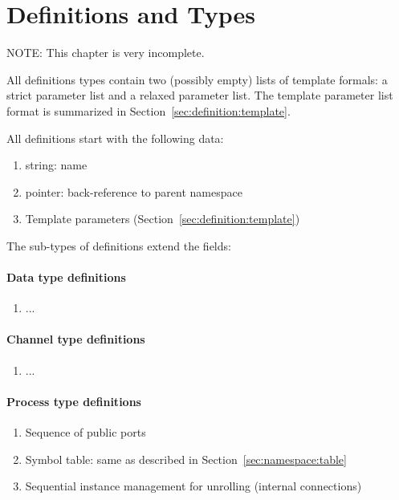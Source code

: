 
\chapter{Definitions and Types}
\label{sec:definition}

NOTE: This chapter is very incomplete.  

All definitions types contain two (possibly empty) lists of template
formals: a strict parameter list and a relaxed parameter list.  
The template parameter list format is summarized
in Section~\ref{sec:definition:template}.  

All definitions start with the following data:
\begin{enumerate}
\item string: name
\item pointer: back-reference to parent namespace
\item Template parameters (Section~\ref{sec:definition:template})
\end{enumerate}

The sub-types of definitions extend the fields:

\subsubsection{Data type definitions}
\begin{enumerate}
\item ...
\end{enumerate}

\subsubsection{Channel type definitions}
\begin{enumerate}
\item ...
\end{enumerate}

\subsubsection{Process type definitions}
\begin{enumerate}
\item Sequence of public ports
\item Symbol table: same as described in Section~\ref{sec:namespace:table}
\item Sequential instance management for unrolling (internal connections)
\end{enumerate}


